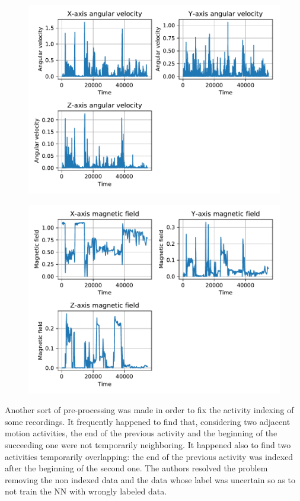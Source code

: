 \begin{figure}
\includegraphics[scale=0.55]{angular_velocity_susanna.pdf}
\caption{}
\label{fig:gyr}
\end{figure}

\begin{figure}
\includegraphics[scale=0.55]{magnetic_field_susanna.pdf}
\caption{}
\label{fig:mag}
\end{figure}


Another sort of pre-processing was made in order to fix the activity indexing of some recordings. It frequently happened to find that, considering two adjacent motion activities, the end of the previous activity and the beginning of the succeeding one were not temporarily neighboring. It happened also to find two activities temporarily overlapping: the end of the previous activity was indexed after the beginning of the second one. 
The authors resolved the problem removing the non indexed data and the data whose label was uncertain so as to not train the NN with wrongly labeled data.

